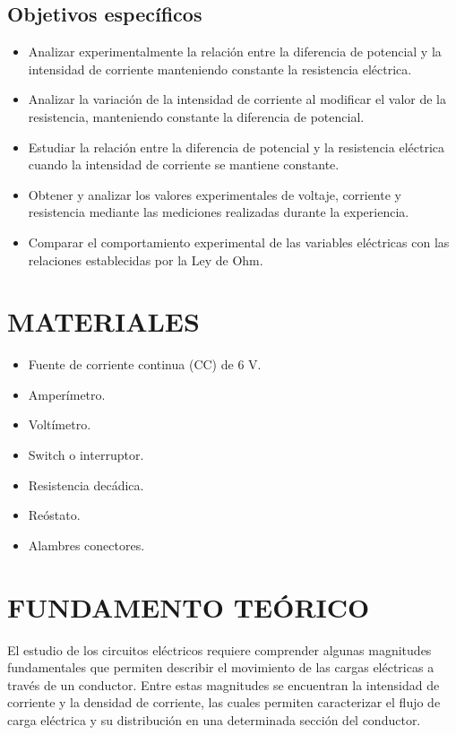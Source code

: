 \documentclass[12pt,a4paper]{article}
\begin{document}
\subsection{Objetivos específicos}
\begin{itemize}
    \item Analizar experimentalmente la relación entre la diferencia de potencial y la intensidad de corriente manteniendo constante la resistencia eléctrica.
    \item Analizar la variación de la intensidad de corriente al modificar el valor de la resistencia, manteniendo constante la diferencia de potencial.
    \item Estudiar la relación entre la diferencia de potencial y la resistencia eléctrica cuando la intensidad de corriente se mantiene constante.
    \item Obtener y analizar los valores experimentales de voltaje, corriente y resistencia mediante las mediciones realizadas durante la experiencia.
    \item Comparar el comportamiento experimental de las variables eléctricas con las relaciones establecidas por la Ley de Ohm.
\end{itemize}

\section{MATERIALES}
\begin{itemize}
    \item Fuente de corriente continua (CC) de 6 V.
    \item Amperímetro.
    \item Voltímetro.
    \item Switch o interruptor.
    \item Resistencia decádica.
    \item Reóstato.
    \item Alambres conectores.
\end{itemize}

\section{FUNDAMENTO TEÓRICO}
El estudio de los circuitos eléctricos requiere comprender algunas magnitudes fundamentales que permiten describir el movimiento de las cargas eléctricas a través de un conductor. Entre estas magnitudes se encuentran la intensidad de corriente y la densidad de corriente, las cuales permiten caracterizar el flujo de carga eléctrica y su distribución en una determinada sección del conductor.
\end{document}
